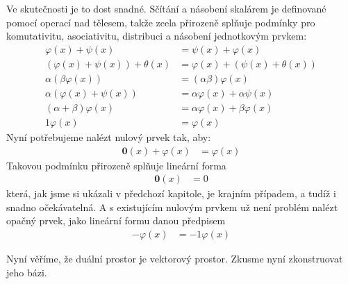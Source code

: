 \documentclass[a5paper,12pt]{amsbook}
\theoremstyle{definition}
\newcommand{\myscalar}[1]{#1}
\newcommand{\myvec}[1]{\mathbf{#1}}
\begin{document}
Ve skutečnosti je to dost snadné. Sčítání a násobení skalárem je definované pomocí operací nad tělesem,
takže zcela přirozeně splňuje podmínky pro komutativitu, asociativitu, distribuci a násobení jednotkovým
prvkem:
\begin{equation*}
\begin{split}
\varphi(x) + \psi(x) &= \psi(x) + \varphi(x)\\
(\varphi(x) + \psi(x)) + \theta(x) &= \varphi(x) + (\psi(x) + \theta(x))\\
\alpha(\beta \varphi(x)) &= (\alpha\beta)\varphi(x)\\
\alpha(\varphi(x) + \psi(x)) &= \alpha\varphi(x) + \alpha\psi(x)\\
(\alpha + \beta)\varphi(x) &= \alpha\varphi(x) + \beta\varphi(x)\\
\myscalar{1}\varphi(x) &= \varphi(x)
\end{split}
\end{equation*}
Nyní potřebujeme nalézt nulový prvek tak, aby:
\begin{equation*}
\begin{split}
\myvec{0}(x) + \varphi(x) &= \varphi(x)
\end{split}
\end{equation*}
Takovou podmínku přirozeně splňuje lineární forma
\begin{equation*}
\begin{split}
\myvec{0}(x) &= \myscalar{0}
\end{split}
\end{equation*}
která, jak jsme si ukázali v předchozí kapitole, je krajním případem, a tudíž i snadno očekávatelná.
A s existujícím nulovým prvkem už není problém nalézt opačný prvek, jako lineární formu danou předpisem
\begin{equation*}
\begin{split}
-\varphi(x) &= \myscalar{-1}\varphi(x)
\end{split}
\end{equation*}

Nyní věříme, že duální prostor je vektorový prostor. Zkusme nyní zkonstruovat jeho bázi.
\end{document}
